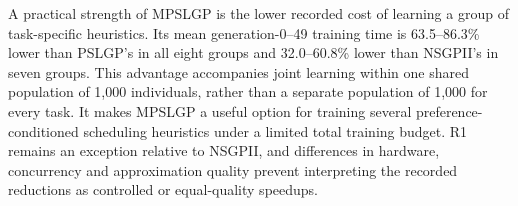 \documentclass[10pt,journal]{IEEEtran}
\newcommand{\resultrevision}[1]{\textcolor{resultrevision}{#1}}
\begin{document}
\resultrevision{A practical strength of MPSLGP is the lower recorded cost of learning a group of task-specific heuristics. Its mean generation-0--49 training time is 63.5--86.3\% lower than PSLGP's in all eight groups and 32.0--60.8\% lower than NSGPII's in seven groups. This advantage accompanies joint learning within one shared population of 1,000 individuals, rather than a separate population of 1,000 for every task. It makes MPSLGP a useful option for training several preference-conditioned scheduling heuristics under a limited total training budget. R1 remains an exception relative to NSGPII, and differences in hardware, concurrency and approximation quality prevent interpreting the recorded reductions as controlled or equal-quality speedups.}



\end{document}
